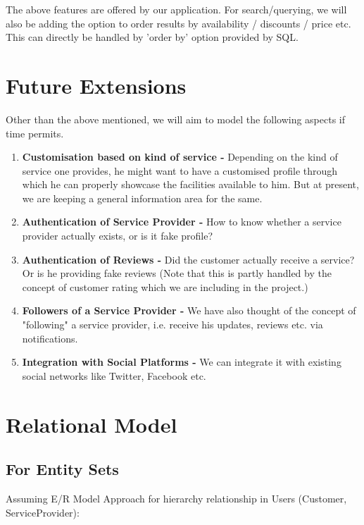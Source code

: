 \documentclass[a4paper]{article}
\begin{document}
The above features are offered by our application. For search/querying, we will also be adding the option to order results by availability / discounts / price etc. This can directly be handled by 'order by' option provided by SQL.



\section{Future Extensions}
Other than the above mentioned, we will aim to model the following aspects if time permits. 

\begin{enumerate}
\item \textbf{Customisation based on kind of service -} Depending on the kind of service one provides, he might want to have a customised profile through which he can properly showcase the facilities available to him. But at present, we are keeping a general information area for the same.
\item \textbf{Authentication of Service Provider -} How to know whether a service provider actually exists, or is it fake profile?
\item \textbf{Authentication of Reviews -} Did the customer actually receive a service? Or is he providing fake reviews (Note that this is partly handled by the concept of customer rating which we are including in the project.)
\item \textbf{Followers of a Service Provider - }We have also thought of the concept of "following" a service provider, i.e. receive his updates, reviews etc. via notifications.
\item \textbf{Integration with Social Platforms - }We can integrate it with existing social networks like Twitter, Facebook etc.
\end{enumerate}


\section{Relational Model}

\subsection{For Entity Sets}
Assuming E/R Model Approach for hierarchy relationship in Users (Customer, ServiceProvider):
\end{document}
